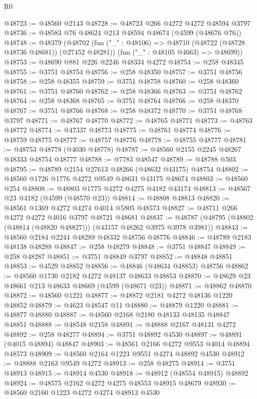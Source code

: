 \begin{lexlean}{R0}
\begin{coremodule}
@48723 := @48560 @2143
@48728 := @48723 @266 @4272 @4272 @48594 @3797
@48736 := @48583 @76 @48624 @213 @48594 @48674 (@4599 (@48676 @76))
@48748 := @48379
    (@48702
      (fun ("_" : @48106) => @48710 (@48722 (@48728 @48736 @48681)) (@27452 @48281))
      (fun ("_" : @48105 @4663) => @48699))
@48753 := @48690 @881 @226 @2246 @48334 @4272
@48754 := @258 @48345
@48755 := @3751 @48754
@48756 := @258 @48350
@48757 := @3751 @48756
@48758 := @258 @48355
@48759 := @3751 @48758
@48760 := @258 @48360
@48761 := @3751 @48760
@48762 := @258 @48366
@48763 := @3751 @48762
@48764 := @258 @48368
@48765 := @3751 @48764
@48766 := @258 @48370
@48767 := @3751 @48766
@48768 := @258 @48372
@48770 := @3751 @48768 @3797
@48771 := @48767 @48770
@48772 := @48765 @48771
@48773 := @48763 @48772
@48774 := @47337 @48773
@48775 := @48761 @48774
@48776 := @48759 @48775
@48777 := @48757 @48776
@48778 := @48755 @48777
@48781 := @48753 @48778 (@4030 @48778)
@48787 := @48560 @2155 @2245 @48267 @48333 @48754 @48777
@48788 := @7783 @48547
@48789 := @48788 @503
@48795 := @48789 @2154 @27613 @48266 (@48632 @43175) @48754
@48802 := @48560 @1726 @1776 @4272 @9549 @48631 @43175 @48674
@48803 := @48560 @254
@48808 := @48803 @1775 @4272 @4275 @4182 @43174
@48813 := @48567 @23 @4182 (@4599 (@48570 @23))
@48814 := @48808 @48813
@48820 := @48561 @1369 @4272 @4274 @4014 @5805 @48573
@48827 := @48711 @266 @4272 @4272 @4016 @3797 @48721 @48681
@48837 := @48787 (@48795 (@48802 (@48814 (@48820 @48827))) (@43157 @48262 @3975 @3978 @3981))
@48843 := @48560 @2184 @2244 @48289 @48332 @48756 @48776
@48846 := @48789 @2183 @48138 @48288
@48847 := @258 @48279
@48848 := @3751 @48847
@48849 := @258 @48287
@48851 := @3751 @48849 @3797
@48852 := @48848 @48851
@48853 := @4529 @48852
@48856 := @48846 (@48634 @48853) @48756
@48862 := @48560 @1730 @2182 @4272 @48137 @48633 @48853
@48870 := @48629 @23 @48661 @213 @48633 @48669 (@4599 (@48671 @23))
@48871 := @48862 @48870
@48872 := @48560 @1221
@48877 := @48872 @2181 @4272 @48136 @1220 @48852
@48879 := @4623 @48547 @11
@48880 := @48879 @1220
@48881 := @48877 @48880
@48887 := @48560 @2168 @2180 @48133 @48135 @48847 @48851
@48888 := @48548 @2158
@48891 := @48888 @2167 @48131 @4272
@48892 := @258 @48277
@48894 := @3751 @48892 @4530
@48897 := @48891 (@4015 @48894) @48847
@48903 := @48561 @2166 @4272 @9553 @4014 @48894 @48573
@48909 := @48560 @2164 @1223 @9551 @4274 @48892 @4530
@48912 := @48888 @2163 @9549 @4272
@48913 := @258 @48275
@48914 := @3751 @48913
@48915 := @48914 @4530
@48918 := @48912 (@48554 @48915) @48892
@48924 := @48575 @2162 @4272 @4275 @48553 @48915 @48679
@48930 := @48560 @2160 @1223 @4272 @4274 @48913 @4530

\end{coremodule}
\end{lexlean}
